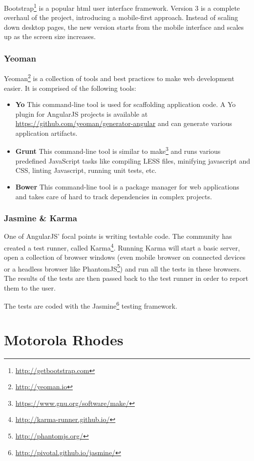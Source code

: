 Bootstrap\footnote{\url{http://getbootstrap.com}} is a popular html user interface framework. Version 3 is a complete overhaul of the project, introducing a mobile-first approach. Instead of scaling down desktop pages, the new version starts from the mobile interface and scales up as the screen size increases. 

\subsubsection{Yeoman}

Yeoman\footnote{\url{http://yeoman.io}} is a collection of tools and best practices to make web development easier. It is comprised of the following tools:
\begin{itemize}
    \item \textbf{Yo} This command-line tool is used for scaffolding application code. A Yo plugin for AngularJS projects is available at \url{https://github.com/yeoman/generator-angular} and can generate various application artifacts.
    \item \textbf{Grunt} This command-line tool is similar to make\footnote{\url{https://www.gnu.org/software/make/}} and runs various predefined JavaScript tasks like compiling LESS files, minifying javascript and CSS, linting Javascript, running unit tests, etc.
    \item \textbf{Bower} This command-line tool is a package manager for web applications and takes care of hard to track dependencies in complex projects. 
\end{itemize}

\subsubsection{Jasmine \& Karma}

One of AngularJS' focal points is writing testable code. The community has created a test runner, called Karma\footnote{\url{http://karma-runner.github.io/}}. Running Karma will start a basic server, open a collection of browser windows (even mobile browser on connected devices or a headless browser like PhantomJS\footnote{\url{http://phantomjs.org/}}) and run all the tests in these browsers. The results of the tests are then passed back to the test runner in order to report them to the user. 

The tests are coded with the Jasmine\footnote{\url{http://pivotal.github.io/jasmine/}} testing framework.

\section{Motorola Rhodes}

